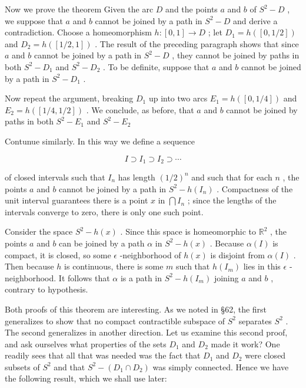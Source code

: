 \documentclass[10pt]{article}
\begin{document}
Now we prove the theorem Given the arc \(D\) and the points \(a\) and \(b\) of \({S}^{2} - D\) , we suppose that \(a\) and \(b\) cannot be joined by a path in \({S}^{2} - D\) and derive a contradiction. Choose a homeomorphism \(h : \left\lbrack  {0,1}\right\rbrack   \rightarrow  D\) ; let \({D}_{1} = h\left( \left\lbrack  {0,1/2}\right\rbrack  \right)\) and \({D}_{2} = h\left( \left\lbrack  {1/2,1}\right\rbrack  \right)\) . The result of the preceding paragraph shows that since \(a\) and \(b\) cannot be joined by a path in \({S}^{2} - D\) , they cannot be joined by paths in both \({S}^{2} - {D}_{1}\) and \({S}^{2} - {D}_{2}\) . To be definite, suppose that \(a\) and \(b\) cannot be joined by a path in \({S}^{2} - {D}_{1}\) .

Now repeat the argument, breaking \({D}_{1}\) up into two arcs \({E}_{1} = h\left( \left\lbrack  {0,1/4}\right\rbrack  \right)\) and \({E}_{2} = h\left( \left\lbrack  {1/4,1/2}\right\rbrack  \right)\) . We conclude, as before, that \(a\) and \(b\) cannot be joined by paths in both \({S}^{2} - {E}_{1}\) and \({S}^{2} - {E}_{2}\)

Contunue similarly. In this way we define a sequence

\[
I \supset  {I}_{1} \supset  {I}_{2} \supset  \cdots
\]

of closed intervals such that \({I}_{n}\) has length \({\left( 1/2\right) }^{n}\) and such that for each \(n\) , the points \(a\) and \(b\) cannot be joined by a path in \({S}^{2} - h\left( {I}_{n}\right)\) . Compactness of the unit interval guarantees there is a point \(x\) in \(\bigcap {I}_{n}\) ; since the lengths of the intervals converge to zero, there is only one such point.

Consider the space \({S}^{2} - h\left( x\right)\) . Since this space is homeomorphic to \({\mathbb{R}}^{2}\) , the points \(a\) and \(b\) can be joined by a path \(\alpha\) in \({S}^{2} - h\left( x\right)\) . Because \(\alpha \left( I\right)\) is compact, it is closed, so some \(\epsilon\) -neighborhood of \(h\left( x\right)\) is disjoint from \(\alpha \left( I\right)\) . Then because \(h\) is continuous, there is some \(m\) such that \(h\left( {I}_{m}\right)\) lies in this \(\epsilon\) -neighborhood. It follows that \(\alpha\) is a path in \({S}^{2} - h\left( {I}_{m}\right)\) joining \(a\) and \(b\) , contrary to hypothesis.

Both proofs of this theorem are interesting. As we noted in §62, the first generalizes to show that no compact contractible subspace of \({S}^{2}\) separates \({S}^{2}\) . The second generalizes in another direction. Let us examine this second proof, and ask ourselves what properties of the sets \({D}_{1}\) and \({D}_{2}\) made it work? One readily sees that all that was needed was the fact that \({D}_{1}\) and \({D}_{2}\) were closed subsets of \({S}^{2}\) and that \({S}^{2} - \left( {{D}_{1} \cap  {D}_{2}}\right)\) was simply connected. Hence we have the following result, which we shall use later:
\end{document}
